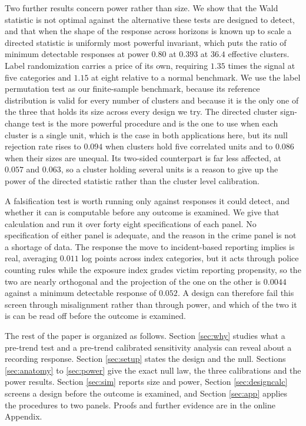 \documentclass[12pt]{article}
\theoremstyle{definition}
\numberwithin{equation}{section}
\begin{document}
Two further results concern power rather than size. We show that the Wald
statistic is not optimal against the alternative these tests are designed to
detect, and that when the shape of the response across horizons is known up to
scale a directed statistic is uniformly most powerful invariant, which puts the
ratio of minimum detectable responses at power $0.80$ at $0.393$ at $36.4$
effective clusters. Label randomization carries a price of its own, requiring
$1.35$ times the signal at five categories and $1.15$ at eight relative to a
normal benchmark. We use the label permutation test as our finite-sample benchmark, because its reference distribution is valid for every number of
clusters and because it is the only one of the three that holds its size across
every design we try. The directed cluster sign-change test is the more powerful
procedure and is the one to use when each cluster is a single unit, which is the
case in both applications here, but its null rejection rate rises to $0.094$
when clusters hold five correlated units and to $0.086$ when their sizes are
unequal. Its two-sided counterpart is far less affected, at $0.057$ and
$0.063$, so a cluster holding several units is a reason to give up the power of
the directed statistic rather than the cluster level calibration.

A falsification test is worth running only against responses it could
detect, and whether it can is computable before any outcome is examined. We
give that calculation and run it over forty eight specifications of each panel.
No specification of either panel is adequate, and the reason in the crime panel
is not a shortage of data. The response the move to incident-based reporting
implies is real, averaging $0.011$ log points across index categories, but it
acts through police counting rules while the exposure index grades victim
reporting propensity, so the two are nearly orthogonal and the projection of the
one on the other is $0.0044$ against a minimum detectable response of $0.052$.
A design can therefore fail this screen through misalignment rather than through
power, and which of the two it is can be read off before the outcome is
examined.

The rest of the paper is organized as follows. Section \ref{sec:why} studies what a pre-trend test and a pre-trend calibrated sensitivity analysis can reveal about a recording response. Section \ref{sec:setup} states the design and the null. Sections \ref{sec:anatomy} to \ref{sec:power} give the exact null law, the three calibrations and the power results. Section \ref{sec:sim} reports size and power, Section \ref{sec:designcalc} screens a design before the outcome is examined, and Section \ref{sec:app} applies the procedures to two panels. Proofs and further evidence are in the online Appendix.
\end{document}
